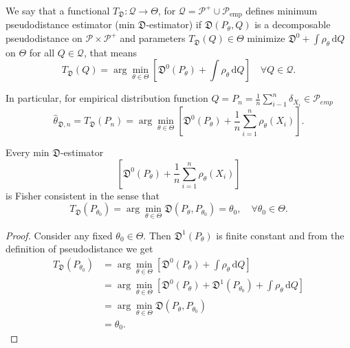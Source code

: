\begin{definition}
	We say that a functional $T_\mathfrak{D}:\mathcal{Q} \rightarrow \Theta$, for $\mathcal{Q}=\mathcal{P}^+ \cup \mathcal{P}_{\text{emp}}$	defines minimum pseudodistance estimator (min $\mathfrak{D}$-estimator) if $\mathfrak{D}(P_\theta,Q)$ is a decomposable pseudodistance on $\mathcal{P}\times\mathcal{P}^+$ and parameters $T_\mathfrak{D}(Q) \in \Theta$ minimize $\mathfrak{D}^0 + \int{\rho_\theta}\,\mathrm{d}Q$ on $\Theta$ for all $Q \in \mathcal{Q}$, that means
	\begin{equation}
		T_\mathfrak{D}(Q) = \arg\min_{\theta \in \Theta} \left[ \mathfrak{D}^0(P_\theta) + \int{\rho_\theta}\,\mathrm{d}Q \right] \quad \forall Q \in \mathcal{Q}.
	\end{equation}
\end{definition}
In particular, for empirical distribution function $Q = P_n = \frac{1}{n}\sum_{i-1}^n \delta_{X_i} \in \mathcal{P}_{emp}$
\begin{equation}
	\hat{\theta}_{\mathfrak{D},n} =T_\mathfrak{D}(P_n)  = \arg\min_{\theta \in \Theta}\left[ \mathfrak{D}^0(P_\theta) + \dfrac{1}{n} \sum_{i=1}^n \rho_\theta (X_i) \right].
\end{equation}
\begin{theorem}
	Every min $\mathfrak{D}$-estimator 
	\begin{equation}
		\left[ \mathfrak{D}^0(P_\theta) + \dfrac{1}{n} \sum_{i=1}^n \rho_\theta (X_i) \right]
	\end{equation}
	is Fisher consistent in the sense that
\begin{equation}
	T_\mathfrak{D}(P_{\theta_0}) = \arg\min_{\theta \in \Theta} \mathfrak{D}(P_\theta, P_{\theta_0}) = \theta_0,\quad \forall \theta_0 \in \Theta.
\end{equation}
\end{theorem}
\begin{proof}
Consider any fixed $\theta_0 \in \Theta$. Then $\mathfrak{D}^1(P_\theta)$ is finite constant and from the definition of pseudodistance we get
\begin{align*}
T_\mathfrak{D}(P_{\theta_0}) & = \arg\min_{\theta \in \Theta} \left[ \mathfrak{D}^0(P_\theta) + \int{\rho_\theta}\,\mathrm{d}Q \right] \\ 
& = \arg\min_{\theta \in \Theta} \left[ \mathfrak{D}^0(P_\theta) +\mathfrak{D}^1(P_{\theta_0}) + \int{\rho_\theta}\,\mathrm{d}Q \right] \\
& = \arg\min_{\theta \in \Theta} \mathfrak{D}(P_\theta,P_{\theta_0}) \\
&= \theta_0.
\end{align*}
\end{proof}


